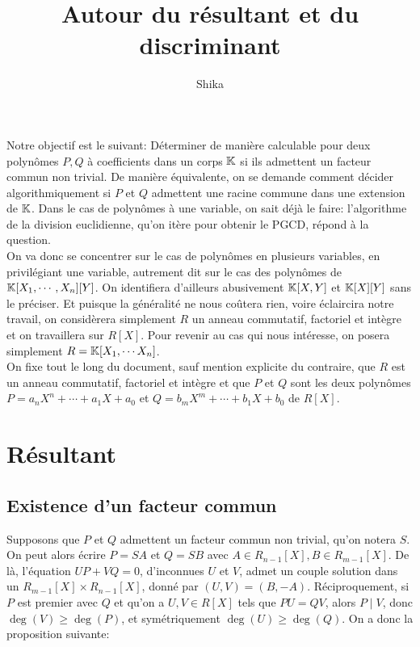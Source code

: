 \documentclass{article}
\title{Autour du résultant et du discriminant}
\author{Shika}
\date{}
\begin{document}
\maketitle

Notre objectif est le suivant: Déterminer de manière calculable pour deux polynômes $P, Q$ à coefficients dans un corps $\mathbb{K}$ si ils admettent un facteur commun non trivial. De manière équivalente, on se demande comment décider algorithmiquement si $P$ et $Q$ admettent une racine commune dans une extension de $\mathbb{K}$.
Dans le cas de polynômes à une variable, on sait déjà le faire: l'algorithme de la division euclidienne, qu'on itère pour obtenir le PGCD, répond à la question.\\
On va donc se concentrer sur le cas de polynômes en plusieurs variables, en privilégiant une variable, autrement dit sur le cas des polynômes de $\mathbb{K}[X_1, \cdots, X_n][Y]$. On identifiera d'ailleurs abusivement $\mathbb{K}[X, Y]$ et $\mathbb{K}[X][Y]$ sans le préciser. Et puisque la généralité ne nous coûtera rien, voire éclaircira notre travail, on considèrera simplement $R$ un anneau commutatif, factoriel et intègre et on travaillera sur $R[X]$. Pour revenir au cas qui nous intéresse, on posera simplement $R = \mathbb{K}[X_1, \cdots X_n]$.\\

On fixe tout le long du document, sauf mention explicite du contraire, que $R$ est un anneau commutatif, factoriel et intègre et que $P$ et $Q$ sont les deux polynômes $P = a_nX^n + \cdots + a_1X + a_0$ et $Q = b_mX^m + \cdots + b_1X + b_0$ de $R[X]$.\\

\section{Résultant}

\subsection{Existence d'un facteur commun}

Supposons que $P$ et $Q$ admettent un facteur commun non trivial, qu'on notera $S$. On peut alors écrire $P = SA$ et $Q = SB$ avec $A \in R_{n-1}[X], B \in R_{m-1}[X]$. 
De là, l'équation $UP + VQ = 0$, d'inconnues $U$ et $V$, admet un couple solution dans un $R_{m-1}[X] \times R_{n-1}[X]$, donné par $(U, V) = (B, -A)$. Réciproquement, si $P$ est premier avec $Q$ et qu'on a $U, V \in R[X]$ tels que $PU = QV$, alors $P \mid V$, donc $\deg(V) \geq \deg(P)$, et symétriquement $\deg(U) \geq \deg(Q)$. On a donc la proposition suivante:
\end{document}
